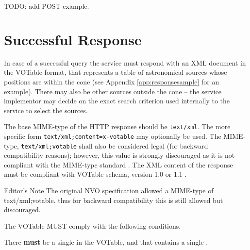 \documentclass[11pt,a4paper]{ivoa}
\begin{document}
TODO: add POST example.

\section{Successful Response}
\label{sec:response}
In case of a successful query the service must respond with an XML document in the VOTable format, that represents a table of astronomical sources whose positions are within the cone (see Appendix \ref{app:responsesample} for an example). There may also be other sources outside the cone -- the service implementor may decide on the exact search criterion used internally to the service to select the sources.

The base MIME-type of the HTTP response should be \texttt{text/xml}. The more specific form \texttt{text/xml;content=x-votable} may optionally be used. The MIME-type, \texttt{text/xml;votable} shall also be considered legal (for backward compatibility reasons); however, this value is strongly discouraged as it is not compliant with the MIME-type standard \citep{std:MIME}. The XML content of the response must be compliant with VOTable schema, version 1.0 \citep{std:VOT11} or 1.1 \citep{2004ivoa.spec.0811O}.

\begin{bigdescription}
	\item[Editor's Note] The original NVO specification allowed a MIME-type of text/xml;votable, thus for backward compatibility this is still allowed but discouraged.
\end{bigdescription}

The VOTable MUST comply with the following conditions.

There \textbf{must} be a single  in the VOTable, and that contains a single .
\end{document}
